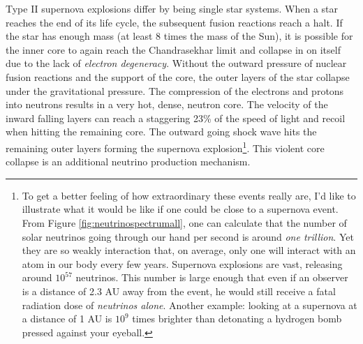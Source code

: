 Type II supernova explosions differ by being single star systems. When a star reaches the end of its life cycle, the subsequent fusion reactions reach a halt. If the star has enough mass (at least 8 times the mass of the Sun), it is possible for the inner core to again reach the Chandrasekhar limit and collapse in on itself due to the lack of \textit{electron degeneracy}. Without the outward pressure of nuclear fusion reactions and the support of the core, the outer layers of the star collapse under the gravitational pressure. The compression of the electrons and protons into neutrons results in a very hot, dense, neutron core. The velocity of the inward falling layers can reach a staggering 23\% of the speed of light and recoil when hitting the remaining core. The outward going shock wave hits the remaining outer layers forming the supernova explosion\footnote{To get a better feeling of how extraordinary these events really are, I'd like to illustrate what it would be like if one could be close to a supernova event. From Figure \ref{fig:neutrinospectrumall}, one can calculate that the number of solar neutrinos going through our hand per second is around \textit{one trillion}. Yet they are so weakly interaction that, on average, only one will interact with an atom in our body every few years. Supernova explosions are vast, releasing around $10^{57}$ neutrinos. This number is large enough that even if an observer is a distance of 2.3 AU away from the event, he would still receive a fatal radiation dose of \textit{neutrinos alone}. Another example: looking at a supernova at a distance of 1 AU is $10^9$ times brighter than detonating a hydrogen bomb pressed against your eyeball.}. This violent core collapse is an additional neutrino production mechanism.

